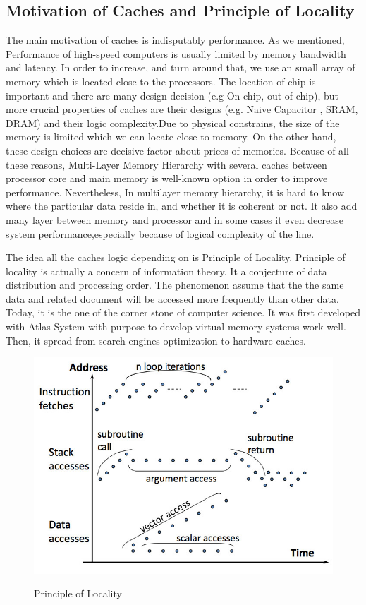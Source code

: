 \documentclass[informationsecurity]{gucmasterproject}
\begin{document}
\subsection{Motivation of Caches and Principle of Locality}
The main motivation of caches is indisputably performance. As we mentioned,  Performance of high-speed computers is usually limited by memory bandwidth and latency. In order to increase, and turn around that, we use an small array of memory which is located close to the processors.  The location of chip is important and there are many design decision (e.g On chip, out of chip), but more crucial  properties of caches are their designs (e.g. Naive Capacitor , SRAM, DRAM) and their logic complexity\cite{hennessy2012computer}.Due to physical constrains, the size of the memory is limited which we can locate close to memory. On the other hand, these design choices are decisive factor about prices of memories.  Because of all these reasons, Multi-Layer Memory Hierarchy with several caches  between processor core and main memory is well-known option in order to improve performance. Nevertheless, In multilayer memory hierarchy, it is hard to know where the particular data reside in, and whether it is coherent or not. It also add many layer between memory and processor and in some cases it even decrease system performance,especially because of logical complexity of the line.

The idea all the caches logic depending on is Principle of Locality. Principle of locality is actually a concern of information theory\cite{shannon2001mathematical}. It a conjecture of data distribution and processing order. The phenomenon assume that the the same data and related document will be accessed more frequently than other data\cite{denning2005locality}. Today, it is the one of the corner stone of computer science.  It was first developed with Atlas System with purpose to develop virtual memory systems work well\cite{kilburn1962one}. Then, it spread from search engines optimization to hardware caches. 

\begin{figure}[h!]
    \centering
    \includegraphics[width=1\textwidth]{localitygraph2.jpg}
    \caption{Principle of Locality}
    \cite{ComputerArchCoursera}
    \label{fig:principleoflocality}
\end{figure}
\end{document}
